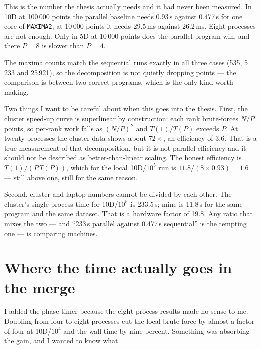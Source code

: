 \documentclass[11pt,a4paper]{article}
\newcommand{\code}[1]{\texttt{#1}}
\begin{document}
This is the number the thesis actually needs and it had never been measured. In
10D at 100\,000 points the parallel baseline needs 0.93\,s against 0.477\,s for
one core of \code{MAXIMA2}; at 10\,000 points it needs 29.5\,ms against
26.2\,ms. Eight processes are not enough. Only in 5D at 10\,000 points does the
parallel program win, and there $P=8$ is slower than $P=4$.

The maxima counts match the sequential runs exactly in all three cases (535,
5\,233 and 25\,921), so the decomposition is not quietly dropping points --- the
comparison is between two correct programs, which is the only kind worth making.

Two things I want to be careful about when this goes into the thesis. First, the
cluster speed-up curve is superlinear by construction: each rank brute-forces
$N/P$ points, so per-rank work falls as $(N/P)^2$ and $T(1)/T(P)$ exceeds $P$. At
twenty processes the cluster data shows about $72\times$, an efficiency of 3.6.
That is a true measurement of that decomposition, but it is not parallel
efficiency and it should not be described as better-than-linear scaling. The
honest efficiency is $T(1)/(P\,T(P))$, which for the local 10D/$10^5$ run is
$11.8/(8\times0.93)=1.6$ --- still above one, still for the same reason.

Second, cluster and laptop numbers cannot be divided by each other. The
cluster's single-process time for 10D/$10^5$ is 233.5\,s; mine is 11.8\,s for
the same program and the same dataset. That is a hardware factor of 19.8. Any
ratio that mixes the two --- and ``233\,s parallel against 0.477\,s sequential''
is the tempting one --- is comparing machines.

\section{Where the time actually goes in the merge}

I added the phase timer because the eight-process results made no sense to me.
Doubling from four to eight processes cut the local brute force by almost a
factor of four at 10D/$10^4$ and the wall time by nine percent. Something was
absorbing the gain, and I wanted to know what.
\end{document}
